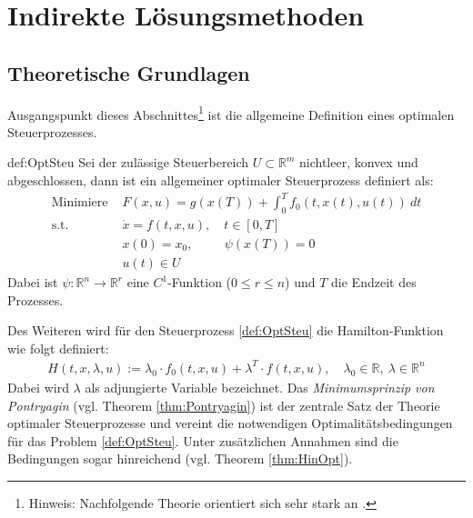 

\chapter{Indirekte Lösungsmethoden}
\section{Theoretische Grundlagen}
Ausgangspunkt dieses Abschnittes\footnote{Hinweis: Nachfolgende Theorie orientiert sich sehr stark an \cite{NumSkript}.} ist die allgemeine Definition eines optimalen Steuerprozesses.
\begin{definition}{def:OptSteu}
	 Sei der zulässige Steuerbereich $U \subset \mathbb{R}^m$ nichtleer, konvex und abgeschlossen, dann ist ein allgemeiner optimaler Steuerprozess definiert als:
	\begin{align}
		\text{Minimiere } &F(x,u) = g(x(T)) + \int_0^T f_0(t,x(t),u(t)) \: dt  \\
						\text{s.t. }& \dot{x} = f(t,x,u), \quad t \in [0,T] \nonumber\\
							 				  &x(0) = x_0, \qquad \: \: \psi(x(T)) = 0 \nonumber\\
							 				  &u(t) \in U \nonumber
	\end{align}
	Dabei ist $\psi: \mathbb{R}^n \rightarrow \mathbb{R}^r$ eine $C^1$-Funktion ($0\leq r \leq n$) und $T$ die Endzeit  des Prozesses.
\end{definition}
Des Weiteren wird für den Steuerprozess \ref{def:OptSteu} die Hamilton-Funktion wie folgt definiert:
\begin{align}
	H(t,x,\lambda,u) := \lambda_0 \cdot f_0(t,x,u) + \lambda^T\cdot f(t,x,u), \quad 	\lambda_0 \in \mathbb{R}, \: \lambda \in \mathbb{R}^{n}
\end{align}
Dabei wird $\lambda$ als adjungierte Variable bezeichnet. Das \textit{Minimumsprinzip von Pontryagin} (vgl. Theorem \ref{thm:Pontryagin}) ist der zentrale Satz der Theorie optimaler Steuerprozesse und vereint die notwendigen Optimalitätsbedingungen für das Problem \ref{def:OptSteu}. Unter zusätzlichen Annahmen sind die Bedingungen sogar hinreichend (vgl. Theorem \ref{thm:HinOpt}).
